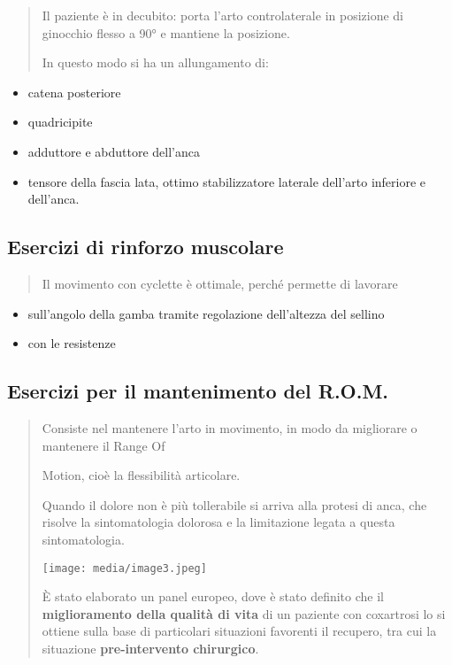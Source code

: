 \documentclass[]{article}
\begin{document}
\begin{quote}
Il paziente è in decubito: porta l'arto controlaterale in posizione di
ginocchio flesso a 90° e mantiene la posizione.

In questo modo si ha un allungamento di:
\end{quote}

\begin{itemize}
\item
  catena posteriore
\item
  quadricipite
\item
  adduttore e abduttore dell'anca
\item
  tensore della fascia lata, ottimo stabilizzatore laterale dell'arto
  inferiore e dell'anca.
\end{itemize}

\subsection{Esercizi di rinforzo
muscolare}\label{esercizi-di-rinforzo-muscolare}

\begin{quote}
Il movimento con cyclette è ottimale, perché permette di lavorare
\end{quote}

\begin{itemize}
\item
  sull'angolo della gamba tramite regolazione dell'altezza del sellino
\item
  con le resistenze
\end{itemize}

\subsection{Esercizi per il mantenimento del
R.O.M.}\label{esercizi-per-il-mantenimento-del-r.o.m.}

\begin{quote}
Consiste nel mantenere l'arto in movimento, in modo da migliorare o
mantenere il Range Of

Motion, cioè la flessibilità articolare.

Quando il dolore non è più tollerabile si arriva alla protesi di anca,
che risolve la sintomatologia dolorosa e la limitazione legata a questa
sintomatologia.

\texttt{[image: media/image3.jpeg]}

È stato elaborato un panel europeo, dove è stato definito che il
\textbf{miglioramento della qualità di vita} di un paziente con
coxartrosi lo si ottiene sulla base di particolari situazioni favorenti
il recupero, tra cui la situazione \textbf{pre-intervento chirurgico}.
\end{quote}
\end{document}
